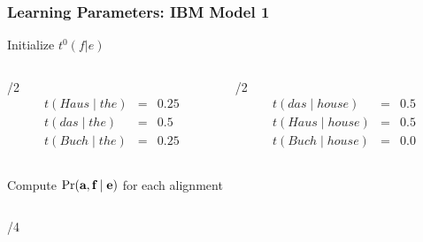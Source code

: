 \begin{frame}
\frametitle{Learning Parameters: IBM Model 1}

\begin{block}{Initialize $t^0(f|e)$}
\begin{columns}

\begin{column}{\textwidth/2}
\[
\begin{array}{ccc}
t(Haus \mid the) & = & 0.25 \\
t(das \mid the) & = & 0.5 \\
t(Buch \mid the) & = & 0.25 
\end{array}
\]

\end{column}

\begin{column}{\textwidth/2}
\[
\begin{array}{ccc}
t(das \mid house) & = & 0.5 \\
t(Haus \mid house) & = & 0.5 \\
t(Buch \mid house) & = & 0.0 
 \end{array}
\]

\end{column}

\end{columns}

\end{block}\pause

\begin{block}{Compute $\Pr(\textbf{a}, \textbf{f} \mid \textbf{e})$ for each alignment}

\begin{columns}[t]

\begin{column}{\textwidth/4}

\end{column}
\end{columns}
\end{block}
\end{frame}
